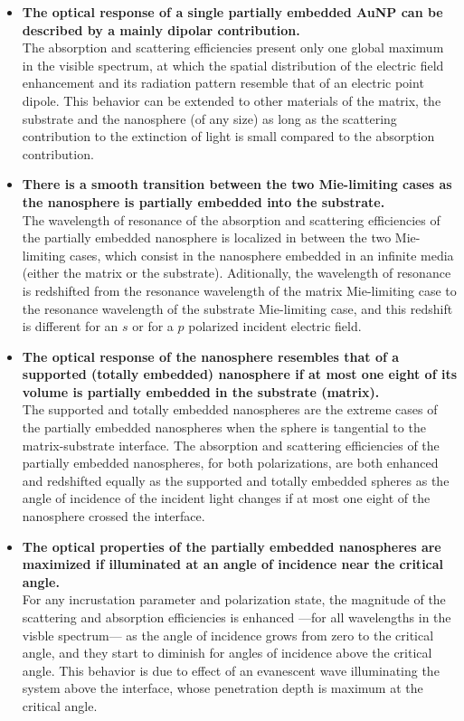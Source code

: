     \begin{itemize}
        \item \textbf{The optical response of a single partially embedded AuNP can be described by a mainly dipolar contribution.}\\
        The absorption and scattering efficiencies present only one global maximum in the visible spectrum, at which the spatial distribution of the electric field enhancement and its radiation pattern resemble that of an electric point dipole. This behavior can be extended to other materials of the matrix, the substrate and the nanosphere (of any size) as long as the scattering contribution to the extinction of light is small compared to the absorption contribution.
        \item \textbf{There is a smooth transition between the two Mie-limiting cases as the nanosphere is partially embedded into the substrate.}\\
        The  wavelength of resonance of the absorption and scattering efficiencies of the partially embedded nanosphere is localized in between the two Mie-limiting cases, which consist in the nanosphere embedded in an infinite media (either the matrix or the substrate). Aditionally, the wavelength of resonance is redshifted from the resonance wavelength of the matrix Mie-limiting case to the resonance wavelength of the substrate Mie-limiting case, and this redshift is different for an $s$ or  for a $p$ polarized incident electric field.
        \item \textbf{The optical response of the nanosphere resembles that of a supported (totally embedded) nanosphere if at most one eight of its volume is partially embedded in the substrate (matrix).}\\
        The supported and totally embedded nanospheres are the extreme cases of the partially embedded nanospheres when the sphere is tangential to the matrix-substrate interface. The absorption and scattering efficiencies of the partially embedded nanospheres, for both polarizations, are both enhanced and redshifted equally as the supported and totally embedded spheres as the angle of incidence of the incident light changes if at most one eight of the nanosphere crossed the interface.
        \item \textbf{The optical properties of the partially embedded nanospheres are maximized if illuminated at an angle of incidence near the critical angle.}\\
        For any incrustation parameter and polarization state, the magnitude of the scattering and absorption efficiencies is enhanced ---for all wavelengths in the visble spectrum--- as the angle of incidence grows from zero to the critical angle, and they start to  diminish for angles of incidence above the critical angle. This behavior is due to effect of an evanescent wave illuminating the system above the interface, whose penetration depth is maximum at the critical angle.

\end{itemize}
